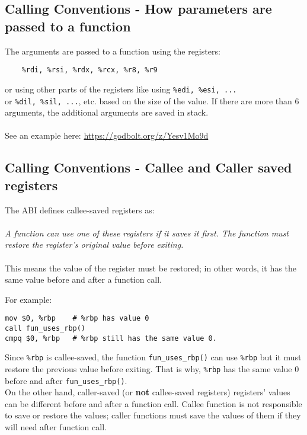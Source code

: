 \documentclass{article}
\begin{document}
\subsection{Calling Conventions - How parameters are passed to a function}
\label{sec: how-args-passed}
The arguments are passed to a function using the registers:
\begin{verbatim}
    %rdi, %rsi, %rdx, %rcx, %r8, %r9
\end{verbatim}
or using other parts of the registers like using \texttt{\%edi, \%esi, ...} \\
or \texttt{\%dil, \%sil, ...}, etc. based on the size of the value. If there are more than 6 arguments, the additional arguments are saved in stack. \\
\\
See an example here: \url{https://godbolt.org/z/Yesv1Mo9d} \\

\subsection{Calling Conventions - Callee and Caller saved registers}
\label{sec: calle-caller-regs}

The ABI defines callee-saved registers as:\\
\\
\textit{A function can use one of these registers if it saves it first. The function must restore the register’s original value before exiting.} \\
\\
This means the value of the register must be restored; in other words, it has the same value before and after a function call.

\noindent For example:
\begin{verbatim}
mov $0, %rbp    # %rbp has value 0
call fun_uses_rbp()
cmpq $0, %rbp   # %rbp still has the same value 0.
\end{verbatim}

Since \texttt{\%rbp} is callee-saved, the function \texttt{fun\_uses\_rbp()} can use \texttt{\%rbp} but it must restore the previous value before exiting. That is why, \texttt{\%rbp} has the same value 0 before and after \texttt{fun\_uses\_rbp()}. \\

On the other hand, caller-saved (or \textbf{not} callee-saved registers) registers' values can be different before and after a function call. Callee function is not responsible to save or restore the values; caller functions must save the values of them if they will need after function call.
\end{document}
